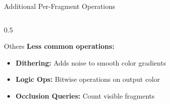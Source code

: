 \begin{frame}{Additional Per-Fragment Operations}
\begin{columns}
\begin{column}{0.5\textwidth}
      \begin{conceptbox}{Others}
        \textbf{Less common operations:}
        \begin{itemize}
          \item \textbf{Dithering:} Adds noise to smooth color gradients
          \item \textbf{Logic Ops:} Bitwise operations on output color
          \item \textbf{Occlusion Queries:} Count visible fragments
        \end{itemize}
      \end{conceptbox}
    \end{column}
  \end{columns}
\end{frame}
